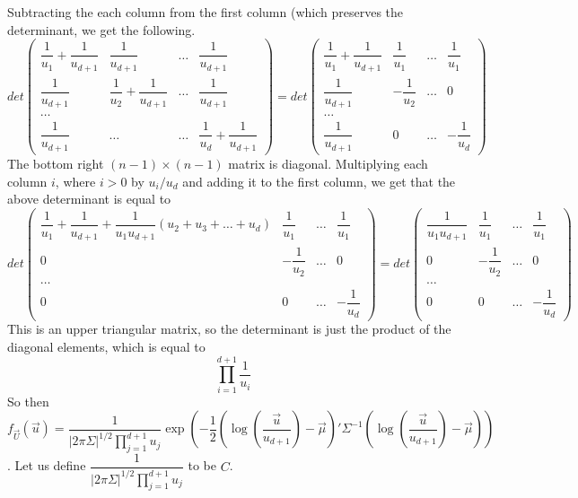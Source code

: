 \documentclass[10pt]{article}
\begin{document}
Subtracting the each column from the first column (which preserves the determinant, we get the following.
\[ det\left( \begin{array}{cccc}
\dfrac{1}{u_1} + \dfrac{1}{u_{d+1}} & \dfrac{1}{u_{d+1}} & \ldots & \dfrac{1}{u_{d+1}} \\
\dfrac{1}{u_{d+1}} & \dfrac{1}{u_2} + \dfrac{1}{u_{d+1}} & \ldots & \dfrac{1}{u_{d+1}} \\
\ldots\\
\dfrac{1}{u_{d+1}} & \ldots & \ldots & \dfrac{1}{u_d} + \dfrac{1}{u_{d+1}} \end{array} \right) = 
det\left( \begin{array}{cccc}
\dfrac{1}{u_1} + \dfrac{1}{u_{d+1}} & \dfrac{1}{u_1} & \ldots & \dfrac{1}{u_1} \\
\dfrac{1}{u_{d+1}} & -\dfrac{1}{u_2} & \ldots & 0 \\
\ldots\\
\dfrac{1}{u_{d+1}} & 0 & \ldots & -\dfrac{1}{u_d} \end{array} \right)
\] 
The bottom right $(n-1) \times (n-1)$ matrix is diagonal. Multiplying each column $i$, where $i > 0$ by $u_i/u_d$ and adding it to the first column, we get that the above determinant is equal to
\[det\left( \begin{array}{cccc}
\dfrac{1}{u_1} + \dfrac{1}{u_{d+1}} + \dfrac{1}{u_1u_{d+1}}(u_2+u_3+\ldots + u_d) & \dfrac{1}{u_1} & \ldots & \dfrac{1}{u_1} \\
0 & -\dfrac{1}{u_2} & \ldots & 0 \\
\ldots\\
0 & 0 & \ldots & -\dfrac{1}{u_d} \end{array} \right)
= 
det\left( \begin{array}{cccc}
\dfrac{1}{u_1u_{d+1}} & \dfrac{1}{u_1} & \ldots & \dfrac{1}{u_1} \\
0 & -\dfrac{1}{u_2} & \ldots & 0 \\
\ldots\\
0 & 0 & \ldots & -\dfrac{1}{u_d} \end{array} \right)\]
This is an upper triangular matrix, so the determinant is just the product of the diagonal elements, which is equal to
\[\prod_{i=1}^{d+1}\dfrac{1}{u_i}\]
So then $f_{\vec{U}}(\vec{u}) = \dfrac{1}{{|2\pi\Sigma|}^{1/2}\prod_{j=1}^{d+1}u_j}\exp\left(-\dfrac{1}{2}\left(\log\left(\dfrac{\vec{u}}{u_{d+1}}\right) - \vec{\mu}\right)'\Sigma^{-1}\left(\log\left(\dfrac{\vec{u}}{u_{d+1}}\right) - \vec{\mu}\right)\right)$. Let us define $\dfrac{1}{{|2\pi\Sigma|}^{1/2}\prod_{j=1}^{d+1}u_j}$ to be $C$.
\end{document}
